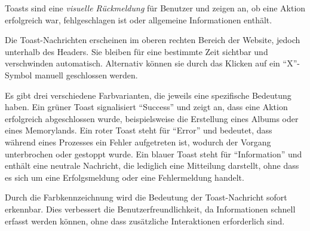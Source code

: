 Toasts sind eine \emph{visuelle Rückmeldung} für Benutzer und zeigen an, ob eine Aktion 
erfolgreich war, fehlgeschlagen ist oder allgemeine Informationen enthält.  

Die Toast-Nachrichten erscheinen im oberen rechten Bereich der Website, jedoch 
unterhalb des Headers. Sie bleiben für eine bestimmte Zeit sichtbar und verschwinden 
automatisch. Alternativ können sie durch das Klicken auf ein ``X''-Symbol manuell 
geschlossen werden.  

Es gibt drei verschiedene Farbvarianten, die jeweils eine spezifische Bedeutung 
haben. Ein grüner Toast signalisiert ``Success'' und zeigt an, dass eine Aktion 
erfolgreich abgeschlossen wurde, beispielsweise die Erstellung eines Albums oder 
eines Memorylands. Ein roter Toast steht für ``Error'' und bedeutet, dass während 
eines Prozesses ein Fehler aufgetreten ist, wodurch der Vorgang unterbrochen oder 
gestoppt wurde. Ein blauer Toast steht für ``Information'' und enthält eine neutrale 
Nachricht, die lediglich eine Mitteilung darstellt, ohne dass es sich um eine 
Erfolgsmeldung oder eine Fehlermeldung handelt.

Durch die Farbkennzeichnung wird die Bedeutung der Toast-Nachricht sofort erkennbar. 
Dies verbessert die Benutzerfreundlichkeit, da Informationen schnell erfasst werden 
können, ohne dass zusätzliche Interaktionen erforderlich sind.







